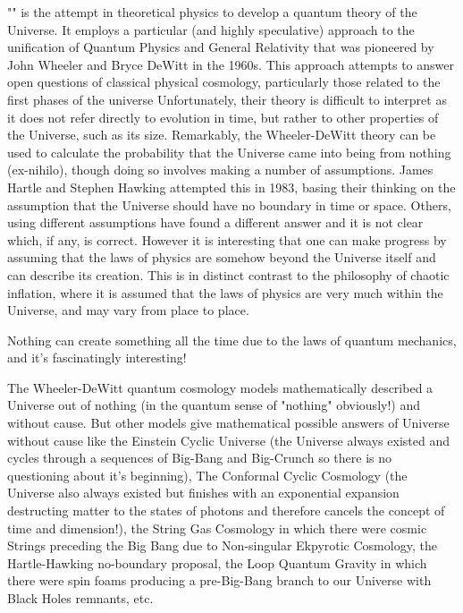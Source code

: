 	"" is the attempt in theoretical physics to develop a quantum theory of the Universe. It employs a particular (and highly speculative) approach to the unification of Quantum Physics and General Relativity that was pioneered by John Wheeler and Bryce DeWitt in the 1960s. This approach attempts to answer open questions of classical physical cosmology, particularly those related to the first phases of the universe  Unfortunately, their theory is difficult to interpret as it does not refer directly to evolution in time, but rather to other properties of the Universe, such as its size. Remarkably, the Wheeler-DeWitt theory can be used to calculate the probability that the Universe came into being from nothing (ex-nihilo), though doing so involves making a number of assumptions. James Hartle and Stephen Hawking attempted this in 1983, basing their thinking on the assumption that the Universe should have no boundary in time or space. Others, using different assumptions have found a different answer and it is not clear which, if any, is correct. However it is interesting that one can make progress by assuming that the laws of physics are somehow beyond the Universe itself and can describe its creation. This is in distinct contrast to the philosophy of chaotic inflation, where it is assumed that the laws of physics are very much within the Universe, and may vary from place to place. 
	
	\begin{fquote}Nothing can create something all the time due to the laws of quantum mechanics, and it's fascinatingly interesting!
 	\end{fquote}
	
	\begin{tcolorbox}[title=Remark,colframe=black,arc=10pt]
	The Wheeler-DeWitt quantum cosmology models mathematically described a Universe out of nothing (in the quantum sense of "nothing" obviously!) and without cause. But other models give mathematical possible answers of Universe without cause like the Einstein Cyclic Universe (the Universe always existed and cycles through a sequences of Big-Bang and Big-Crunch so there is no questioning about it's beginning), The Conformal Cyclic Cosmology (the Universe also always existed but finishes with an exponential expansion destructing matter to the states of photons and therefore cancels the concept of time and dimension!), the String Gas Cosmology in which there were cosmic Strings preceding the Big Bang due to Non-singular Ekpyrotic Cosmology, the Hartle-Hawking no-boundary proposal, the Loop Quantum Gravity in which there were spin foams producing a pre-Big-Bang branch to our Universe with Black Holes remnants, etc.
	\end{tcolorbox}

